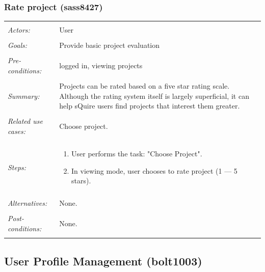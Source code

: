 \documentclass[11pt]{report}
\begin{document}
\subsubsection{Rate project (sass8427)}
\begin{tabular}{ p{2cm} p{12cm} }
 \hline
 \\
 \textit{Actors:} & User \\ 
 \\
 \textit{Goals:} & Provide basic project evaluation \\
 \\
 \textit{Pre-conditions:} & logged in, viewing projects \\
\\
 \textit{Summary:} & Projects can be rated based on a five star rating scale. Although the rating system itself is largely superficial, it can help sQuire users find projects that interest them greater. \\ 
 \\
 \textit{Related use cases:} & Choose project.\\ 
 \\
 \textit{Steps:} & \begin{enumerate}
  \item User performs the task: "Choose Project". 
  \item In viewing mode, user chooses to rate project (1 --- 5 stars).
 \end{enumerate} \\
 \\
 \textit{Alternatives:} & None. \\
 \\
 \textit{Post-conditions:} & None. \\
 \\
\hline
\end{tabular}



\subsection{User Profile Management (bolt1003)}
\end{document}
